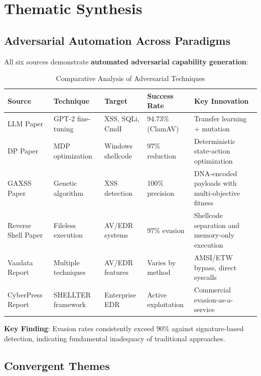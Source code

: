 \documentclass[11pt,conference]{IEEEtran}
\begin{document}
\section{Thematic Synthesis}

\subsection{Adversarial Automation Across Paradigms}

All six sources demonstrate \textbf{automated adversarial capability generation}:

\begin{table}[h]
\centering
\caption{Comparative Analysis of Adversarial Techniques}
\begin{tabular}{p{}p{}p{}p{}p{}}
\toprule
\textbf{Source} & \textbf{Technique} & \textbf{Target} & \textbf{Success Rate} & \textbf{Key Innovation} \\
\midrule
LLM Paper & GPT-2 fine-tuning & XSS, SQLi, CmdI & 94.73\% (ClamAV) & Transfer learning + mutation \\
\midrule
DP Paper & MDP optimization & Windows shellcode & 97\% reduction & Deterministic state-action optimization \\
\midrule
GAXSS Paper & Genetic algorithm & XSS detection & 100\% precision & DNA-encoded payloads with multi-objective fitness \\
\midrule
Reverse Shell Paper & Fileless execution & AV/EDR systems & 97\% evasion & Shellcode separation and memory-only execution \\
\midrule
Vaadata Report & Multiple techniques & AV/EDR features & Varies by method & AMSI/ETW bypass, direct syscalls \\
\midrule
CyberPress Report & SHELLTER framework & Enterprise EDR & Active exploitation & Commercial evasion-as-a-service \\
\bottomrule
\end{tabular}
\end{table}

\textbf{Key Finding}: Evasion rates consistently exceed 90\% against signature-based detection, indicating fundamental inadequacy of traditional approaches.

\subsection{Convergent Themes}
\end{document}
